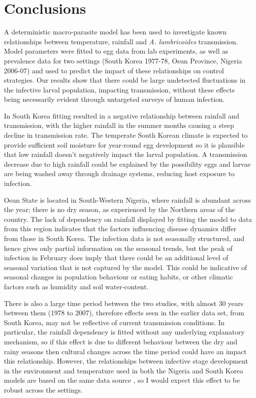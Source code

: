 \FloatBarrier

\section{Conclusions}

A deterministic macro-parasite model has been used to investigate known relationships between temperature, rainfall and \textit{A. lumbricoides} transmission. Model parameters were fitted to egg data from lab experiments, as well as prevalence data for two settings (South Korea 1977-78, Osun Province, Nigeria 2006-07) and used to predict the impact of these relationships on control strategies. Our results show that there could be large undetected fluctuations in the infective larval population, impacting transmission, without these effects being necessarily evident through untargeted surveys of human infection. 

In South Korea fitting resulted in a negative relationship between rainfall and transmission, with the higher rainfall in the summer months causing a steep decline in transmission rate. The temperate South Korean climate is expected to provide sufficient soil moisture for year-round egg development so it is plausible that low rainfall doesn't negatively impact the larval population. A transmission decrease due to high rainfall could be explained by the possibility eggs and larvae are being washed away through drainage systems, reducing host exposure to infection. 

Osun State is located in South-Western Nigeria, where rainfall is abundant across the year; there is no dry season, as experienced by the Northern areas of the country. The lack of dependency on rainfall displayed by fitting the model to data from this region indicates that the factors influencing disease dynamics differ from those in South Korea. The infection data is not seasonally structured, and hence gives only partial information on the seasonal trends, but the peak of infection in February does imply that there could be an additional level of seasonal variation that is not captured by the model. This could be indicative of seasonal changes in population behaviour or eating habits, or other climatic factors such as humidity and soil water-content.

There is also a large time period between the two studies, with almost 30 years between them (1978 to 2007), therefore effects seen in the earlier data set, from South Korea, may not be reflective of current transmission conditions. In particular, the rainfall dependency is fitted without any underlying explanatory mechanism, so if this effect is due to different behaviour between the dry and rainy seasons then cultural changes across the time period could have an impact this relationship. However, the relationships between infective stage development in the environment and temperature used in both the Nigeria and South Korea models are based on the same data source \cite{Wagner,Kim,Arene}, so I would expect this effect to be robust across the settings.

